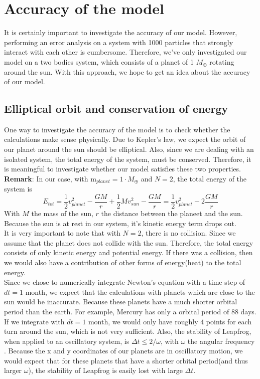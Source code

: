 \section{Accuracy of the model}
It is certainly important to investigate the accuracy of our model. 
However, performing an error analysis on a system with 1000 particles that strongly interact with each other is cumbersome. 
Therefore, we've only investigated our model on a two bodies system, which consists of a planet of 1 $M_{\oplus}$ rotating around the sun. 
With this approach, we hope to get an idea about the accuracy of our model.

\subsection{Elliptical orbit and conservation of energy}
One way to investigate the accuracy of the model is to check whether the calculations make sense physically. Due to Kepler's law, we expect the orbit of our planet around the sun should be elliptical. 
Also, since we are dealing with an isolated system, the total energy of the system, must be conserved. 
Therefore, it is meaningful to investigate whether our model satisfies these two properties.\\ 

\textbf{Remark}: In our case, with $\text{m}_{planet}=1\cdot M_{\oplus}$ and $N=2$, the total energy of the system is \cite{Energy}
\[E_{tot}=\frac{1}{2}v_{planet}^2-\frac{GM}{r}+\frac{1}{2}Mv_{sun}^2-\frac{GM}{r}=\frac{1}{2}v_{planet}^2-2\frac{GM}{r}\]
With $M$ the mass of the sun, $r$ the distance between the planeet and the sun. 
Because the sun is at rest in our system, it's kinetic energy term drops out.\\
It is very important to note that with $N=2$, there is no collision. Since we assume that the planet does not collide with the sun. Therefore, the total energy consists of only kinetic energy and potential energy. If there was a collision, then we would also have a contribution of other forms of energy(heat) to the total energy.\\

Since we chose to numerically integrate Newton's equation with a time step of $dt=1$ month, we expect that the calculations with planets which are close to the sun would be inaccurate. 
Because these planets have a much shorter orbital period than the earth. 
For example, Mercury has only a orbital period of 88 days. If we integrate with $dt=1$ month, we would only have roughly $4$ points for each turn around the sun, which is not very sufficient. 
Also, the stability of Leapfrog, when applied to an oscillatory system, is $\Delta t\leq 2/\omega$, with $\omega$ the angular frequency \cite{StabLeapfrog}. 
Because the x and y coordinates of our planets are in oscillatory motion, we would expect that for these planets that have a shorter orbital period(and thus larger $\omega$), the stability of Leapfrog is easily lost with large $\Delta t$.\\

